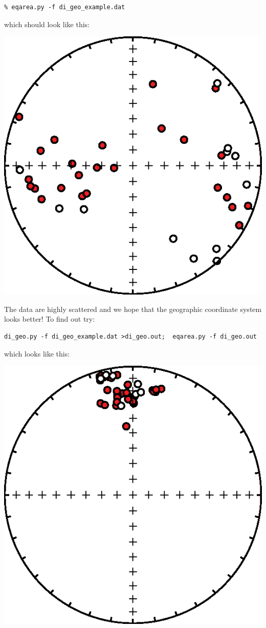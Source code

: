 \documentclass[11pt]{book}
\begin{document}
{{{\begin{verbatim}
% eqarea.py -f di_geo_example.dat
\end{verbatim}
which should look like this:  

  \includegraphics[width=12 cm]{EPSfiles/di_geo_spc_eq.eps}



The data are highly scattered and we hope that the geographic coordinate system looks better!  To find out try:
\begin{verbatim}
di_geo.py -f di_geo_example.dat >di_geo.out;  eqarea.py -f di_geo.out

\end{verbatim}

\noindent which looks like this:

  \includegraphics[width=12 cm]{EPSfiles/di_geo_geo_eq.eps}
  
}}}
\end{document}
